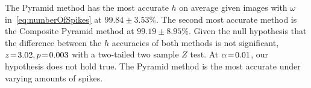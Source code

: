 The Pyramid method has the most accurate $h$ on average given images with $\omega$ in~\autoref{eq:numberOfSpikes}
at $99.84\!\pm\!3.53\%$.
The second most accurate method is the Composite Pyramid method at $99.19\!\pm\!8.95\%$.
Given the null hypothesis that the difference between the $h$ accuracies of both methods is not significant,
$z \!=\! 3.02, p \!=\! 0.003$ with a two-tailed two sample $Z$ test.
At $\alpha \!=\! 0.01$, our hypothesis does not hold true.
The Pyramid method is the most accurate under varying amounts of spikes.

